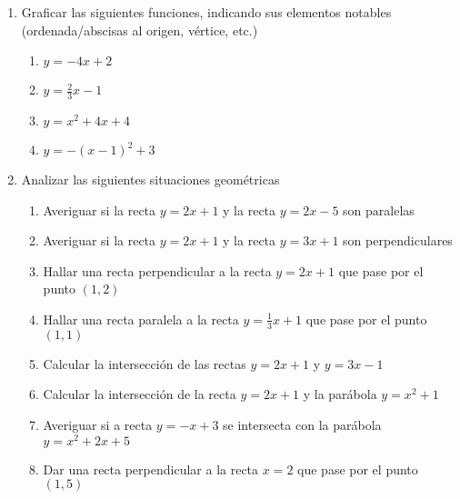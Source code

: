 \documentclass[a4paper]{article}
\newcommand{\exercise}{\item}
\begin{document}
\begin{enumerate}
\begin{multicols}{2}
\begin{enumerate} [label=(\alph*)]
		\item $3 \sqrt{x}$ con $x \in \mathbb{N}$
		\item $\displaystyle\frac{x^2}{x-4}$ con $x \in \mathbb{Z}$ y $x \neq 4$
		\item $\displaystyle\frac{\sqrt{3}x-3}{2}$ con $x \in \mathbb{Z}$
		\item $x+3$ con $x \in \mathbb{Q}$
		\item $\displaystyle\frac{1}{x}$ con $x \in \mathbb{Q}$ y $x \neq 0$
		\item $\sqrt{x}$ con $x \in \mathbb{Q}$
	\end{enumerate}
	\end{multicols}
	\exercise Graficar las siguientes funciones, indicando sus elementos notables (ordenada/abscisas al origen, vértice, etc.)
	\begin{enumerate} [label=(\alph*)]
		\item $y=-4x+2$
		\item $y=\displaystyle\frac{2}{3}x-1$
		\item $y=x^2+4x+4$
		\item $y=-(x-1)^2+3$
	\end{enumerate}
	\exercise Analizar las siguientes situaciones geométricas
	\begin{enumerate} [label=(\alph*)]
		\item Averiguar si la recta $y=2x+1$ y la recta $y=2x-5$ son paralelas
		\item Averiguar si la recta $y=2x+1$ y la recta $y=3x+1$ son perpendiculares
		\item Hallar una recta perpendicular a la recta $y=2x+1$ que pase por el punto $(1,2)$
		\item Hallar una recta paralela a la recta $y=\frac{1}{3}x+1$ que pase por el punto $(1,1)$
		\item Calcular la intersección de las rectas $y=2x+1$ y $y=3x-1$
		\item Calcular la intersección de la recta $y=2x+1$ y la parábola $y=x^2+1$
		\item Averiguar si a recta $y=-x+3$ se intersecta con la parábola $y=x^2+2x+5$
		\item Dar una recta perpendicular a la recta $x=2$ que pase por el punto $(1,5)$
	\end{enumerate}
\end{enumerate}
\end{document}
